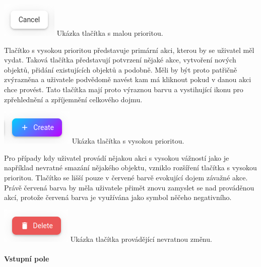 			\includegraphics[width=0.24\linewidth]{obrazky/tlacitko_s_malou_prioritou}\hfill
			Ukázka tlačítka s malou prioritou. %

			Tlačítko s vysokou prioritou představuje primární akci, kterou by se uživatel měl vydat.
			Taková tlačítka představují potvrzení nějaké akce, vytvoření nových objektů, přidání existujících objektů a
			podobně.
			Měli by být proto patřičně zvýrazněna a uživatele podvědomě navést kam má kliknout pokud v danou akci chce
			provést.
			Tato tlačítka mají proto výraznou barvu a vystihující ikonu pro zpřehlednění a zpříjemnění celkového dojmu.

			\includegraphics[width=0.24\linewidth]{obrazky/tlacitko_s_velkou_prioritou}\hfill
			Ukázka tlačítka s vysokou prioritou. %

			Pro případy kdy uživatel provádí nějakou akci s vysokou vážností jako je například nevratné smazání nějakého
			objektu, vzniklo rozšíření tlačítka s vysokou prioritou.
			Tlačítko se lišší pouze v červené barvě evokující dojem závažné akce.
			Právě červená barva by měla uživatele přimět znovu zamyslet se nad prováděnou akcí, protože červená barva
			je využívána jako symbol něčeho negativního.

			\includegraphics[width=0.24\linewidth]{obrazky/tlacitko_s_velkou_prioritou_a_velkou_vaznosti}\hfill
			Ukázka tlačítka provádějící nevratnou změnu. %

			\paragraph{Vstupní pole}

